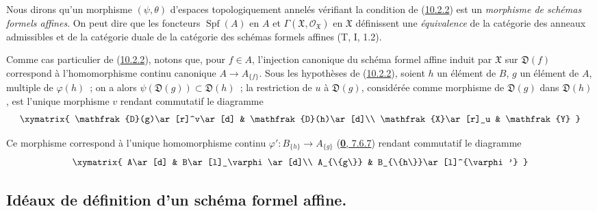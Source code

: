 Nous dirons qu'un morphisme $(\psi,\theta)$ d'espaces topologiquement
annelés vérifiant la condition de (\hyperref[I.10.2.2-fr]{10.2.2}) est un
\emph{morphisme de schémas formels affines}. On peut dire que les foncteurs
$\operatorname{Spf}(A)$ en $A$ et
$\Gamma(\mathfrak{X},\mathscr{O}_{\mathfrak{X}})$ en $\mathfrak{X}$
définissent une \emph{équivalence} de la catégorie des anneaux admissibles
et de la catégorie duale de la catégorie des schémas formels affines
(T, I, 1.2).

\begin{env}[10.2.3]
\label{I.10.2.3-fr}
Comme cas particulier de (\hyperref[I.10.2.2-fr]{10.2.2}), notons que, pour
$f\in A$, l'injection canonique du schéma formel affine induit par
$\mathfrak{X}$ sur $\mathfrak{D}(f)$ correspond à l'homomorphisme continu
canonique $A\to A_{\{f\}}$. Sous les hypothèses de
(\hyperref[I.10.2.2-fr]{10.2.2}), soient $h$ un élément de $B$, $g$ un
élément de $A$, multiple de $\varphi(h)$~; on a alors
$\psi(\mathfrak{D}(g))\subset\mathfrak{D}(h)$~; la restriction de $u$ à
$\mathfrak{D}(g)$, considérée comme morphisme de $\mathfrak{D}(g)$ dans
$\mathfrak{D}(h)$, est l'unique morphisme $v$ rendant commutatif le
diagramme
\[
  \xymatrix{
    \mathfrak{D}(g)\ar[r]^v\ar[d] &
    \mathfrak{D}(h)\ar[d]\\
    \mathfrak{X}\ar[r]_u &
    \mathfrak{Y}
  }
\]

Ce morphisme correspond à l'unique homomorphisme continu
$\varphi':B_{\{h\}}\to A_{\{g\}}$
(\hyperref[0.7.6.7-fr]{\textbf{0}, 7.6.7}) rendant commutatif le diagramme
\[
  \xymatrix{
    A\ar[d] &
    B\ar[l]_\varphi\ar[d]\\
    A_{\{g\}} &
    B_{\{h\}}\ar[l]^{\varphi'}
  }
\]
\end{env}

\subsection{Idéaux de définition d'un schéma formel affine.}
\label{subsection:I.10.3-fr}

